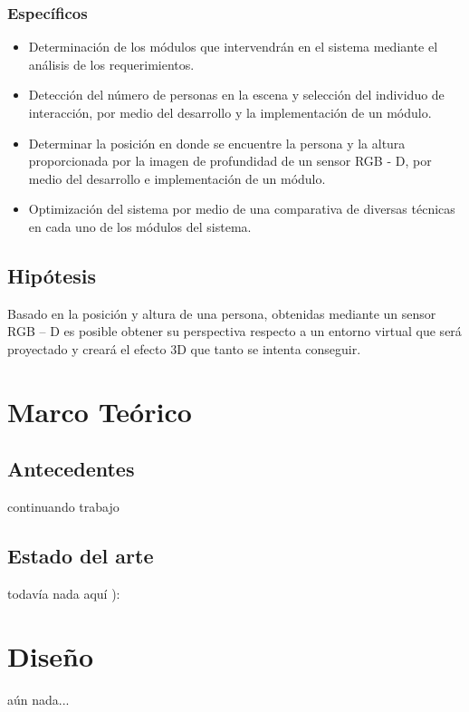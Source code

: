 \documentclass[a4paper,openright,12pt]{report}
\begin{document}
\subsection{Específicos}
\begin{itemize}
\item Determinación de los módulos que intervendrán en el sistema mediante el análisis de los requerimientos.
\item Detección del número de personas en la escena y selección del individuo de interacción, por medio del desarrollo y la implementación de un módulo.
\item Determinar la posición en donde se encuentre la persona y la altura proporcionada por la imagen de profundidad de un sensor RGB - D, por medio del desarrollo e implementación de un módulo.
\item Optimización del sistema por medio de una comparativa de diversas técnicas en cada uno de los módulos del sistema.
\end{itemize}
%

\section{Hipótesis}
Basado en la posición y altura de una persona, obtenidas mediante un sensor RGB – D es posible obtener su perspectiva respecto a un entorno virtual que será proyectado y creará el efecto 3D que tanto se intenta conseguir.

\chapter{Marco Teórico}\label{cap.marcoteorico}
\section{Antecedentes}
continuando trabajo
\section{Estado del arte}
todavía nada aquí ):

\chapter{Dise\~no}\label{cap.diseno}
aún nada...
\end{document}
